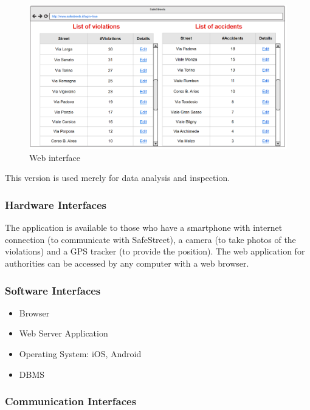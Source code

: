 \begin{figure}
[H]
\includegraphics[scale=0.5255]{Images/Templates/Authority/auth_4.PNG}
\caption{\label{fig:Mockup-8}Web interface}
\end{figure}

This version is used merely for data analysis and inspection.

\subsubsection{Hardware Interfaces}

The application is available to those who have a smartphone with internet connection (to communicate with SafeStreet), a camera (to take photos of the violations) and a GPS tracker (to provide the position).
The web application for authorities can be accessed by any computer with a web browser.

\subsubsection{Software Interfaces}

\begin{itemize}

\item Browser
\item Web Server Application
\item Operating System: iOS, Android
\item DBMS

\end{itemize} 

\subsubsection{Communication Interfaces}

